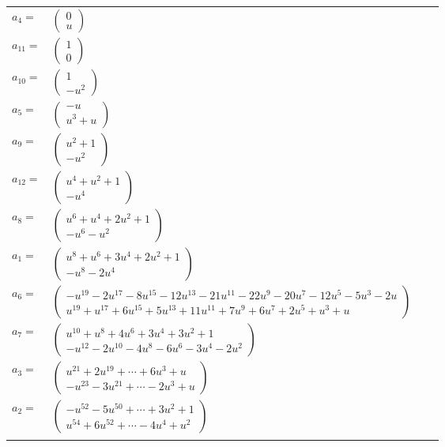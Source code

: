 \documentclass[1p]{elsarticle_modified}
\theoremstyle{definition}
\begin{document}
\begin{tabular}{m{7pt} m{180pt} m{7pt} m{180pt} }
\flushright $a_{4}=$&$\begin{pmatrix}0\\u\end{pmatrix}$ \\
\flushright $a_{11}=$&$\begin{pmatrix}1\\0\end{pmatrix}$ \\
\flushright $a_{10}=$&$\begin{pmatrix}1\\- u^2\end{pmatrix}$ \\
\flushright $a_{5}=$&$\begin{pmatrix}- u\\u^3+u\end{pmatrix}$ \\
\flushright $a_{9}=$&$\begin{pmatrix}u^2+1\\- u^2\end{pmatrix}$ \\
\flushright $a_{12}=$&$\begin{pmatrix}u^4+u^2+1\\- u^4\end{pmatrix}$ \\
\flushright $a_{8}=$&$\begin{pmatrix}u^6+u^4+2 u^2+1\\- u^6- u^2\end{pmatrix}$ \\
\flushright $a_{1}=$&$\begin{pmatrix}u^8+u^6+3 u^4+2 u^2+1\\- u^8-2 u^4\end{pmatrix}$ \\
\flushright $a_{6}=$&$\begin{pmatrix}- u^{19}-2 u^{17}-8 u^{15}-12 u^{13}-21 u^{11}-22 u^9-20 u^7-12 u^5-5 u^3-2 u\\u^{19}+u^{17}+6 u^{15}+5 u^{13}+11 u^{11}+7 u^9+6 u^7+2 u^5+u^3+u\end{pmatrix}$ \\
\flushright $a_{7}=$&$\begin{pmatrix}u^{10}+u^8+4 u^6+3 u^4+3 u^2+1\\- u^{12}-2 u^{10}-4 u^8-6 u^6-3 u^4-2 u^2\end{pmatrix}$ \\
\flushright $a_{3}=$&$\begin{pmatrix}u^{21}+2 u^{19}+\cdots+6 u^3+u\\- u^{23}-3 u^{21}+\cdots-2 u^3+u\end{pmatrix}$ \\
\flushright $a_{2}=$&$\begin{pmatrix}- u^{52}-5 u^{50}+\cdots+3 u^2+1\\u^{54}+6 u^{52}+\cdots-4 u^4+u^2\end{pmatrix}$\\&\end{tabular}
\end{document}

